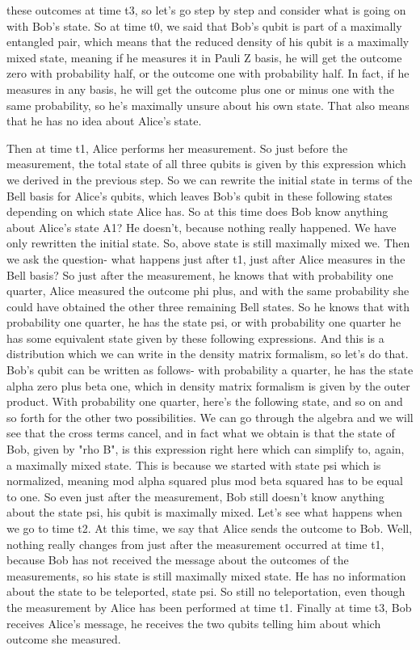 these outcomes at time t3, so let's go step by step and consider what is going on with Bob's state. So at time t0, we said that Bob's qubit is part of a maximally entangled pair, which means that the reduced density of his qubit is a maximally mixed state, meaning if he measures it in Pauli Z basis, he will get the outcome zero with probability half, or the outcome one with probability half. In fact, if he measures in any basis, he will get the outcome plus one or minus one with the same probability, so he's maximally unsure about his own state. That also means that he has no idea about Alice's state.

Then at time t1, Alice performs her measurement. So just before the measurement, the total state of all three qubits is given by this expression which we derived in the previous step. So we can rewrite the initial state in terms of the Bell basis for Alice's qubits, which leaves Bob's qubit in these following states depending on which state Alice has. So at this time does Bob know anything about Alice's state A1? He doesn't, because nothing really happened. We have only rewritten the initial state. So, above state is still maximally mixed we. Then we ask the question- what happens just after t1, just after Alice measures in the Bell basis? So just after the measurement, he knows that with probability one quarter, Alice measured the outcome phi plus, and with the same probability she could have obtained the other three remaining Bell states. So he knows that with probability one quarter, he has the state psi, or with probability one quarter he has some equivalent state given by these following expressions. And this is a distribution which we can write in the density matrix formalism, so let's do that. Bob's qubit can be written as follows- with probability a quarter, he has the state alpha zero plus beta one, which in density matrix formalism is given by the outer product. With probability one quarter, here's the following state, and so on and so forth for the other two possibilities. We can go through the algebra and we will see that the cross terms cancel, and in fact what we obtain is that the state of Bob, given by "rho B", is this expression right here which can simplify to, again, a maximally mixed state. This is because we started with state psi which is normalized, meaning mod alpha squared plus mod beta squared has to be equal to one. So even just after the measurement, Bob still doesn't know anything about the state psi, his qubit is maximally mixed. Let's see what happens when we go to time t2. At this time, we say that Alice sends the outcome to Bob. Well, nothing really changes from just after the measurement occurred at time t1, because Bob has not received the message about the outcomes of the measurements, so his state is still maximally mixed state. He has no information about the state to be teleported, state psi. So still no teleportation, even though the measurement by Alice has been performed at time t1. Finally at time t3, Bob receives Alice's message, he receives the two qubits telling him about which outcome she measured.


